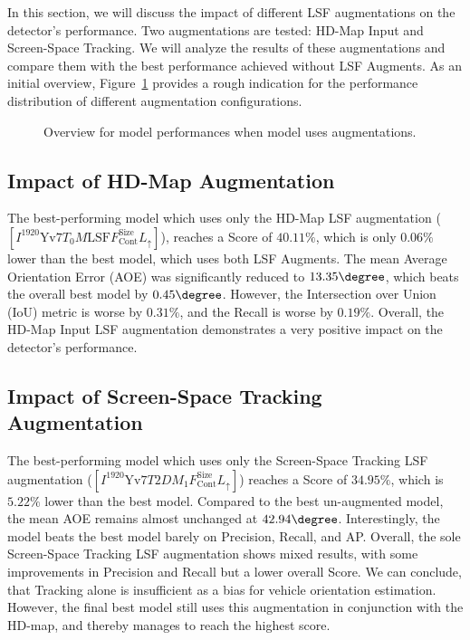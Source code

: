 In this section, we will discuss the impact of different LSF augmentations on the detector's performance.
Two augmentations are tested: HD-Map Input and Screen-Space Tracking.
We will analyze the results of these augmentations and compare them with the best performance achieved without LSF Augments.
As an initial overview, Figure~\ref{fig:lsf-augmentations-overview} provides a rough indication for the performance distribution of different augmentation configurations.

\begin{figure}[htb]
    
    \caption{Overview for model performances when model uses augmentations.}
    \label{fig:lsf-augmentations-overview}
\end{figure}

\subsection{Impact of HD-Map Augmentation}
\label{subsec:impactmap}

The best-performing model which uses only the HD-Map LSF augmentation ($\left[I^{1920}\text{Yv7}T_0M\text{LSF}F_\text{Cont}^\text{Size}L_{\uparrow}\right]$), reaches a Score of $40.11\%$, which is only $0.06\%$ lower than the best model, which uses both LSF Augments.
The mean Average Orientation Error (AOE) was significantly reduced to $13.35\degree$, which beats the overall best model by $0.45\degree$.
However, the Intersection over Union (IoU) metric is worse by $0.31\%$, and the Recall is worse by $0.19\%$.
Overall, the HD-Map Input LSF augmentation demonstrates a very positive impact on the detector's performance.

\subsection{Impact of Screen-Space Tracking Augmentation}
\label{subsec:impactlsf}

The best-performing model which uses only the Screen-Space Tracking LSF augmentation ($\left[I^{1920}\text{Yv7}T{2D}M_1F_\text{Cont}^\text{Size}L_{\uparrow}\right]$) reaches a Score of $34.95\%$, which is $5.22\%$ lower than the best model.
Compared to the best un-augmented model, the mean AOE remains almost unchanged at $42.94\degree$.
Interestingly, the model beats the best model barely on Precision, Recall, and AP.
Overall, the sole Screen-Space Tracking LSF augmentation shows mixed results, with some improvements in Precision and Recall but a lower overall Score.
We can conclude, that Tracking alone is insufficient as a bias for vehicle orientation estimation.
However, the final best model still uses this augmentation in conjunction with the HD-map, and thereby manages to reach the highest score.

